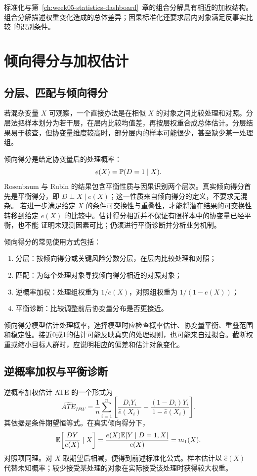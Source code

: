 标准化与第~\ref{ch:week05-statistics-dashboard}~章的组合分解具有相近的加权结构。
组合分解描述权重变化造成的总体差异；因果标准化还要求层内对象满足反事实比较
的识别条件。

\section{倾向得分与加权估计}
\subsection{分层、匹配与倾向得分}

若混杂变量 \(X\) 可观察，一个直接办法是在相似 \(X\) 的对象之间比较处理和对照。分层法把样本划分为若干层，在层内比较均值差，再按层权重合成总体估计。分层结果易于核查，但协变量维度较高时，部分层内的样本可能很少，甚至缺少某一处理组。

倾向得分是给定协变量后的处理概率：
\[
  e(X)=\mathbb P(D=1\mid X).
\]
Rosenbaum 与 Rubin 的结果包含平衡性质与因果识别两个层次。真实倾向得分首先是平衡得分，即
\(D\perp X\mid e(X)\)；这一性质来自倾向得分的定义，不要求无混杂。
若进一步满足给定 \(X\) 的条件可交换性与重叠性，才能将潜在结果的可交换性
转移到给定 \(e(X)\) 的比较中。估计得分相近并不保证有限样本中的协变量已经平衡，也不能
证明未观测因素可比；仍须进行平衡诊断并分析业务机制。

倾向得分的常见使用方式包括：
\begin{enumerate}
  \item 分层：按倾向得分或关键风险分数分层，在层内比较处理和对照；
  \item 匹配：为每个处理对象寻找倾向得分相近的对照对象；
  \item 逆概率加权：处理组权重为 \(1/e(X)\)，对照组权重为 \(1/(1-e(X))\)；
  \item 平衡诊断：比较调整前后协变量分布是否更接近。
\end{enumerate}

倾向得分模型估计处理概率，选择模型时应检查概率估计、协变量平衡、重叠范围和稳定性。接近0或1的估计可能反映真实的处理规则，也可能来自过拟合。截断权重或缩小目标人群时，应说明相应的偏差和估计对象变化。

\subsection{逆概率加权与平衡诊断}

逆概率加权估计 ATE 的一个形式为
\[
  \widehat{ATE}_{IPW}
  =
  \frac{1}{n}\sum_{i=1}^{n}
  \left[
    \frac{D_iY_i}{\hat e(X_i)}
    -
    \frac{(1-D_i)Y_i}{1-\hat e(X_i)}
  \right].
\]
其依据是条件期望恒等式。在真实倾向得分下，
\[
\mathbb E\!\left[\frac{DY}{e(X)}\mid X\right]
=\frac{e(X)\mathbb E[Y\mid D=1,X]}{e(X)}=m_1(X).
\]
对照项同理。对 \(X\) 取期望后相减，便得到前述标准化公式。样本估计以
\(\hat e(X)\) 代替未知概率；较少接受某处理的对象在实际接受该处理时获得较大权重。

